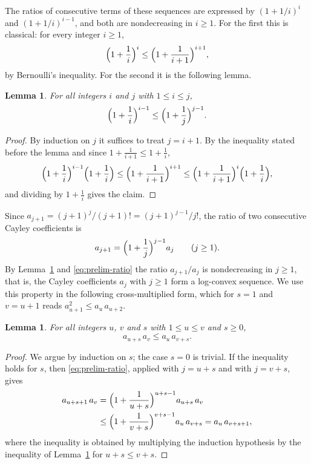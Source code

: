 \documentclass{amsart}
\newtheorem{lemma}[theorem]{Lemma}
\theoremstyle{definition}
\theoremstyle{remark}
\numberwithin{equation}{section}
\begin{document}
The ratios of consecutive terms of these sequences are expressed by $(1+1/i)^{i}$ and $(1+1/i)^{i-1}$, and both are nondecreasing in $i\ge 1$. For the first this is classical: for every integer $i\ge 1$,
\begin{equation}\label{eq:prelim-euler}
\Bigl(1+\frac{1}{i}\Bigr)^{i}\le\Bigl(1+\frac{1}{i+1}\Bigr)^{i+1},
\end{equation}
by Bernoulli's inequality. For the second it is the following lemma.

\begin{lemma}\label{lem:powermono}
For all integers $i$ and $j$ with $1\le i\le j$,
\[
\Bigl(1+\frac{1}{i}\Bigr)^{i-1}\le\Bigl(1+\frac{1}{j}\Bigr)^{j-1}.
\]
\end{lemma}

\begin{proof}
By induction on $j$ it suffices to treat $j=i+1$. By the inequality stated before the lemma and since $1+\frac{1}{i+1}\le 1+\frac1i$,
\[
\Bigl(1+\frac{1}{i}\Bigr)^{i-1}\Bigl(1+\frac{1}{i}\Bigr)
\le\Bigl(1+\frac{1}{i+1}\Bigr)^{i+1}
\le\Bigl(1+\frac{1}{i+1}\Bigr)^{i}\Bigl(1+\frac{1}{i}\Bigr),
\]
and dividing by $1+\frac1i$ gives the claim.
\end{proof}

Since $a_{j+1}=(j+1)^{j}/(j+1)!=(j+1)^{j-1}/j!$, the ratio of two consecutive Cayley coefficients is
\begin{equation}\label{eq:prelim-ratio}
a_{j+1}=\Bigl(1+\frac{1}{j}\Bigr)^{j-1}a_j\qquad(j\ge 1).
\end{equation}
By Lemma~\ref{lem:powermono} and \eqref{eq:prelim-ratio} the ratio $a_{j+1}/a_j$ is nondecreasing in $j\ge 1$, that is, the Cayley coefficients $a_j$ with $j\ge 1$ form a log-convex sequence. We use this property in the following cross-multiplied form, which for $s=1$ and $v=u+1$ reads $a_{u+1}^2\le a_u\,a_{u+2}$.

\begin{lemma}\label{lem:cayleylogconvex}
For all integers $u$, $v$ and $s$ with $1\le u\le v$ and $s\ge 0$,
\[
a_{u+s}\,a_v\le a_u\,a_{v+s}.
\]
\end{lemma}

\begin{proof}
We argue by induction on $s$; the case $s=0$ is trivial. If the inequality holds for $s$, then \eqref{eq:prelim-ratio}, applied with $j=u+s$ and with $j=v+s$, gives
\begin{align*}
a_{u+s+1}\,a_v&=\Bigl(1+\frac{1}{u+s}\Bigr)^{u+s-1}a_{u+s}\,a_v\\
&\le\Bigl(1+\frac{1}{v+s}\Bigr)^{v+s-1}a_u\,a_{v+s}=a_u\,a_{v+s+1},
\end{align*}
where the inequality is obtained by multiplying the induction hypothesis by the inequality of Lemma~\ref{lem:powermono} for $u+s\le v+s$.
\end{proof}
\end{document}
